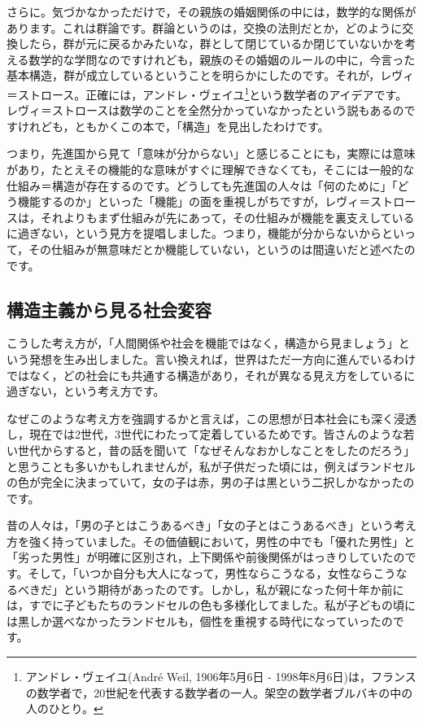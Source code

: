 \documentclass{ltjsbook}
\begin{document}
さらに。気づかなかっただけで，その親族の婚姻関係の中には，数学的な関係があります。これは群論です。群論というのは，交換の法則だとか，どのように交換したら，群が元に戻るかみたいな，群として閉じているか閉じていないかを考える数学的な学問なのですけれども，親族のその婚姻のルールの中に，今言った基本構造，群が成立しているということを明らかにしたのです。それが，レヴィ＝ストロース。正確には，アンドレ・ヴェイユ\footnote{アンドレ・ヴェイユ(Andr\'{e} Weil, 1906年5月6日 - 1998年8月6日)は，フランスの数学者で，20世紀を代表する数学者の一人。架空の数学者ブルバキの中の人のひとり。}という数学者のアイデアです。レヴィ＝ストロースは数学のことを全然分かっていなかったという説もあるのですけれども，ともかくこの本で，「構造」を見出したわけです。

つまり，先進国から見て「意味が分からない」と感じることにも，実際には意味があり，たとえその機能的な意味がすぐに理解できなくても，そこには一般的な仕組み＝構造が存在するのです。どうしても先進国の人々は「何のために」「どう機能するのか」といった「機能」の面を重視しがちですが，レヴィ＝ストロースは，それよりもまず仕組みが先にあって，その仕組みが機能を裏支えしているに過ぎない，という見方を提唱しました。つまり，機能が分からないからといって，その仕組みが無意味だとか機能していない，というのは間違いだと述べたのです。

\subsection{構造主義から見る社会変容}

こうした考え方が，「人間関係や社会を機能ではなく，構造から見ましょう」という発想を生み出しました。言い換えれば，世界はただ一方向に進んでいるわけではなく，どの社会にも共通する構造があり，それが異なる見え方をしているに過ぎない，という考え方です。

なぜこのような考え方を強調するかと言えば，この思想が日本社会にも深く浸透し，現在では2世代，3世代にわたって定着しているためです。皆さんのような若い世代からすると，昔の話を聞いて「なぜそんなおかしなことをしたのだろう」と思うことも多いかもしれませんが，私が子供だった頃には，例えばランドセルの色が完全に決まっていて，女の子は赤，男の子は黒という二択しかなかったのです。

昔の人々は，「男の子とはこうあるべき」「女の子とはこうあるべき」という考え方を強く持っていました。その価値観において，男性の中でも「優れた男性」と「劣った男性」が明確に区別され，上下関係や前後関係がはっきりしていたのです。そして，「いつか自分も大人になって，男性ならこうなる，女性ならこうなるべきだ」という期待があったのです。しかし，私が親になった何十年か前には，すでに子どもたちのランドセルの色も多様化してました。私が子どもの頃には黒しか選べなかったランドセルも，個性を重視する時代になっていったのです。
\end{document}
